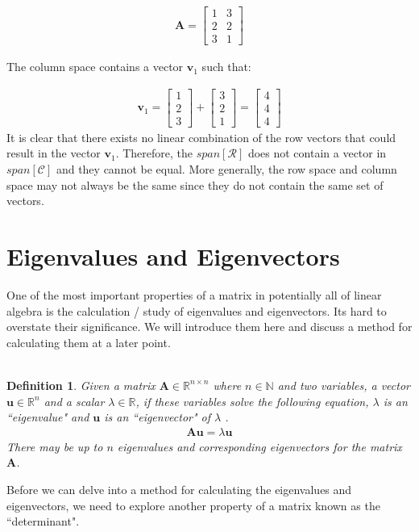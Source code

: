 \documentclass[a4paper,12pt]{article}
\newcommand{\set}[1]{\mathcal{#1}}
\newcommand{\matrx}[1]{\bm{#1}}
\newcommand{\vectr}[1]{\textbf{#1}}
\newcommand{\real}{\mathbb{R}}
\newcommand{\natral}{\mathbb{N}}
\newtheorem{definition}{Definition}[section]
\begin{document}
	\begin{align}
		\matrx{A} = \begin{bmatrix}
			1 & 3 \\
			2 & 2 \\
			3 & 1 
		\end{bmatrix}
	\end{align} 
	
	The column space contains a vector $ \vectr{v}_1 $ such that:
	
	\begin{align}
		\vectr{v}_1 = \begin{bmatrix}
			1 \\
			2 \\
			3 
		\end{bmatrix} + \begin{bmatrix}
			3 \\
			2 \\
			1 
		\end{bmatrix} = \begin{bmatrix}
			4 \\
			4 \\
			4 
		\end{bmatrix}
	\end{align}
	It is clear that there exists no linear combination of the row vectors that could result in the vector $ \vectr{v}_1 $. Therefore, the $ span[\set{R}] $ does not contain a vector in $ span[\set{C}] $ and they cannot be equal. More generally, the row space and column space may not always be the same since they do not contain the same set of vectors. 
	\section{Eigenvalues and Eigenvectors} \label{sec:eigen}
	One of the most important properties of a matrix in potentially all of linear algebra is the calculation / study of eigenvalues and eigenvectors. Its hard to overstate their significance. We will introduce them here and discuss a method for calculating them at a later point. 
	\\\\
	\begin{definition}
		\normalfont Given a matrix $ \matrx{A} \in \real^{n \times n} $ where $ n \in \natral $ and two variables, a vector $ \vectr{u} \in \real^{n} $ and a scalar $ \lambda \in \real $, if these variables solve the following equation, $ \lambda $ is an ``eigenvalue" and $ \vectr{u} $ is an ``eigenvector" of $ \lambda $ \cite{def_eigen_vec_val}.
		\begin{align}
			\matrx{A} \vectr{u} = \lambda \vectr{u}
		\end{align}
		There may be up to $ n $ eigenvalues and corresponding eigenvectors for the matrix $ \matrx{A} $.
		\label{def:eigenvalue_eigenvector} 
	\end{definition} 
	Before we can delve into a method for calculating the eigenvalues and eigenvectors, we need to explore another property of a matrix known as the ``determinant".
\end{document}
